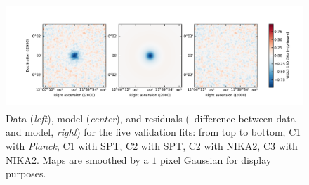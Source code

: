 \begin{figure}[t]
    \includegraphics[height=4cm, trim={2cm 0.7cm 1.5cm 1.5cm}, clip]{../validation/results/C3/NIKA2/data_model_residuals_maps.pdf}
    \caption{
        Data (\textit{left}), model (\textit{center}), and residuals (\ie\ difference between data and model, \textit{right}) for the five validation fits:
        from top to bottom, C1 with \textit{Planck}, C1 with SPT, C2 with SPT, C2 with NIKA2, C3 with NIKA2.
        Maps are smoothed by a $1$ pixel Gaussian for display purposes.
    }
    \label{fig:valid:dmr_2d}
\end{figure}


